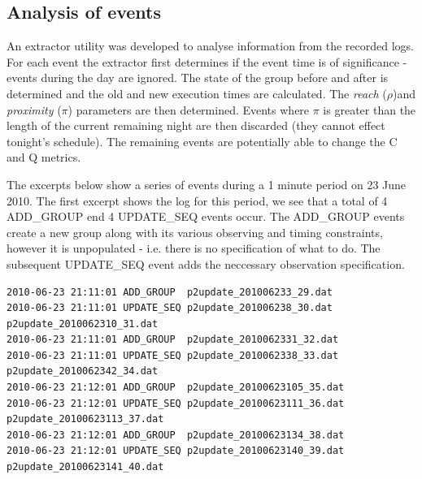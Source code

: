 





\subsection{Analysis of events}
\label{sect:volanal}
An extractor utility was developed to analyse information from the recorded logs. For each event the extractor first determines if the event time is of significance - events during the day are ignored. The state of the group before and after is determined and the old and new execution times are calculated. The \emph{reach} ($\rho$)and \emph{proximity} ($\pi$) parameters are then determined. Events where $\pi$ is greater than the length of the current remaining night are then discarded (they cannot effect tonight's schedule). The remaining events are potentially able to change the C and Q metrics. 


The excerpts below show a series of events during a 1 minute period on 23 June 2010. The first excerpt shows the log for this period, we see that a total of 4  \textsc{ADD\_GROUP} end 4 \textsc{UPDATE\_SEQ} events occur. The \textsc{ADD\_GROUP} events create a new group along with its various observing and timing constraints, however it is unpopulated - i.e. there is no specification of what to do. The subsequent \textsc{UPDATE\_SEQ} event adds the neccessary observation specification.

\scriptsize
\begin{verbatim}
2010-06-23 21:11:01 ADD_GROUP  p2update_201006233_29.dat
2010-06-23 21:11:01 UPDATE_SEQ p2update_201006238_30.dat   p2update_2010062310_31.dat
2010-06-23 21:11:01 ADD_GROUP  p2update_2010062331_32.dat
2010-06-23 21:11:01 UPDATE_SEQ p2update_2010062338_33.dat  p2update_2010062342_34.dat
2010-06-23 21:12:01 ADD_GROUP  p2update_20100623105_35.dat
2010-06-23 21:12:01 UPDATE_SEQ p2update_20100623111_36.dat p2update_20100623113_37.dat
2010-06-23 21:12:01 ADD_GROUP  p2update_20100623134_38.dat
2010-06-23 21:12:01 UPDATE_SEQ p2update_20100623140_39.dat p2update_20100623141_40.dat
\end{verbatim}
\normalsize

